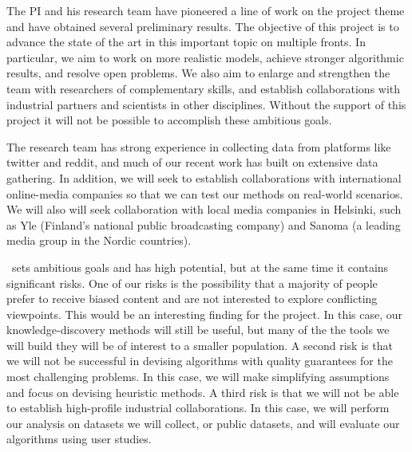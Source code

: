 \documentclass[a4paper,11pt]{article}
\begin{document}
\smallskip 
The PI and his research team have pioneered a line of work on the project theme
and have obtained several preliminary results.
The objective of this project is to advance the state of the art in this important topic
on multiple fronts. 
In particular, we aim to work on more realistic models, 
achieve stronger algorithmic results, 
and resolve open problems. 
We also aim to enlarge and strengthen the team with researchers of complementary skills, 
and establish collaborations with industrial partners and scientists in other disciplines.
Without the support of this project it will not be possible to accomplish these ambitious goals.

\smallskip 
The research team has strong experience in collecting data from platforms like twitter and reddit, 
and much of our recent work has built on extensive data gathering.
In addition, we will seek to establish collaborations with international online-media companies
so that we can test our methods on real-world scenarios. 
We will also will seek collaboration with local media companies in Helsinki, 
such as
Yle (Finland's national public broadcasting company)
and Sanoma (a leading media group in the Nordic countries).


\acronym\ sets ambitious goals and has high potential, 
but at the same time it contains significant risks.
One of our risks is the possibility 
that a majority of people prefer to receive biased content
and are not interested to explore conflicting viewpoints.
This would be an in\-ter\-est\-ing finding for the project.
In this case, our knowledge-discovery methods will still be useful, 
but many of the the tools we will build they will be of interest to a smaller population.
A second risk is that we will not be successful in devising 
algorithms with quality guarantees for the most challenging problems. 
In this case, we will make simplifying assumptions and 
focus on devising heuristic methods. 
A third risk is that we will not be able to establish high-profile industrial collaborations. 
In this case, we will perform our analysis on datasets we will collect, 
or public datasets, and will evaluate our algorithms using user studies. 

\newpage
{\footnotesize
\setlength{\bibsep}{0pt}


}
\end{document}
